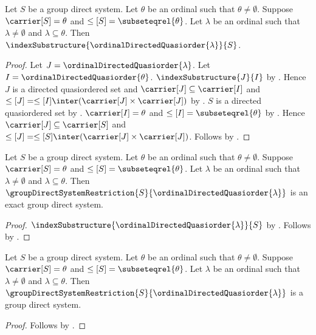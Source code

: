 \begin{proposition}\label{ordinal_index_substructure_of_group_system}
    Let $S$ be a group direct system.
    Let $\theta$ be an ordinal such that $\theta\neq\emptyset$.
    Suppose $\carrier[S]=\theta$ and
        $\leq[S]=\subseteqrel{\theta}$.
    Let $\lambda$ be an ordinal such that
        $\lambda\neq\emptyset$ and $\lambda\subseteq\theta$.
    Then $\indexSubstructure
        {\ordinalDirectedQuasiorder{\lambda}}{S}$.
\end{proposition}
\begin{proof}
    Let $J=\ordinalDirectedQuasiorder{\lambda}$.
    Let $I=\ordinalDirectedQuasiorder{\theta}$.
    $\indexSubstructure{J}{I}$ by
        .
    Hence $J$ is a directed quasiordered set and
        $\carrier[J]\subseteq\carrier[I]$ and
        $\leq[J]=\leq[I]\inter
            (\carrier[J]\times\carrier[J])$ by
        .
    $S$ is a directed quasiordered set by
        .
    $\carrier[I]=\theta$ and
        $\leq[I]=\subseteqrel{\theta}$ by
        .
    Hence $\carrier[J]\subseteq\carrier[S]$ and
        $\leq[J]=\leq[S]\inter
            (\carrier[J]\times\carrier[J])$.
    Follows by .
\end{proof}

\begin{theorem}\label{ordinal_group_direct_system_restriction_is_exact}
    Let $S$ be a group direct system.
    Let $\theta$ be an ordinal such that $\theta\neq\emptyset$.
    Suppose $\carrier[S]=\theta$ and
        $\leq[S]=\subseteqrel{\theta}$.
    Let $\lambda$ be an ordinal such that
        $\lambda\neq\emptyset$ and $\lambda\subseteq\theta$.
    Then $\groupDirectSystemRestriction
        {S}{\ordinalDirectedQuasiorder{\lambda}}$ is an exact
        group direct system.
\end{theorem}
\begin{proof}
    $\indexSubstructure
        {\ordinalDirectedQuasiorder{\lambda}}{S}$ by
        .
    Follows by .
\end{proof}

\begin{corollary}\label{ordinal_group_direct_system_restriction_is_system}
    Let $S$ be a group direct system.
    Let $\theta$ be an ordinal such that $\theta\neq\emptyset$.
    Suppose $\carrier[S]=\theta$ and
        $\leq[S]=\subseteqrel{\theta}$.
    Let $\lambda$ be an ordinal such that
        $\lambda\neq\emptyset$ and $\lambda\subseteq\theta$.
    Then $\groupDirectSystemRestriction
        {S}{\ordinalDirectedQuasiorder{\lambda}}$ is a
        group direct system.
\end{corollary}
\begin{proof}
    Follows by
        .
\end{proof}

